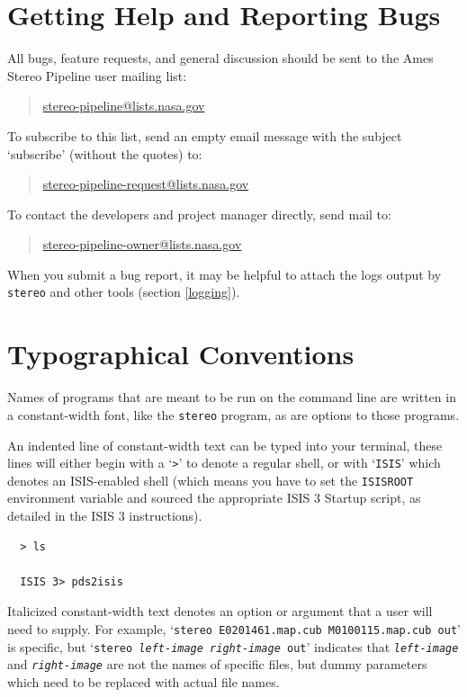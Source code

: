 \pagebreak
\section{Getting Help and Reporting Bugs}\label{get-help}

All bugs, feature requests, and general discussion should be sent to
the Ames Stereo Pipeline user mailing list:
\begin{quote}
\indent \href{mailto:stereo-pipeline@lists.nasa.gov}{stereo-pipeline@lists.nasa.gov}
\end{quote}
To subscribe to this list, send an empty email message with the
subject `subscribe' (without the quotes) to:
\begin{quote}
\indent \href{mailto:stereo-pipeline-request@lists.nasa.gov}{stereo-pipeline-request@lists.nasa.gov}
\end{quote}
To contact the developers and project manager directly, send mail
to:
\begin{quote}
\indent \href{mailto:stereo-pipeline-owner@lists.nasa.gov}{stereo-pipeline-owner@lists.nasa.gov}
\end{quote}

When you submit a bug report, it may be helpful to attach the logs
output by \texttt{stereo} and other tools (section \ref{logging}).

\section{Typographical Conventions}

Names of programs that are meant to be run on the command line are
written in a constant-width font, like the \texttt{stereo} program,
as are options to those programs.

An indented line of constant-width text can be typed into your
terminal, these lines will either begin with a `\texttt{>}' to
denote a regular shell, or with `\texttt{ISIS}' which denotes an
\ac{ISIS}-enabled shell (which means you have to set the \texttt{ISISROOT}
environment variable and sourced the appropriate \ac{ISIS} 3 Startup
script, as detailed in the \ac{ISIS} 3 instructions).
\begin{verbatim}
  > ls

  ISIS 3> pds2isis
\end{verbatim}

Italicized constant-width text denotes an option or argument that
a user will need to supply.  For example, `\texttt{stereo E0201461.map.cub
M0100115.map.cub out}' is specific, but `\texttt{stereo \textit{left-image
right-image} out}' indicates that \texttt{\textit{left-image}} and
\texttt{\textit{right-image}} are not the names of specific files,
but dummy parameters which need to be replaced with actual file
names.

